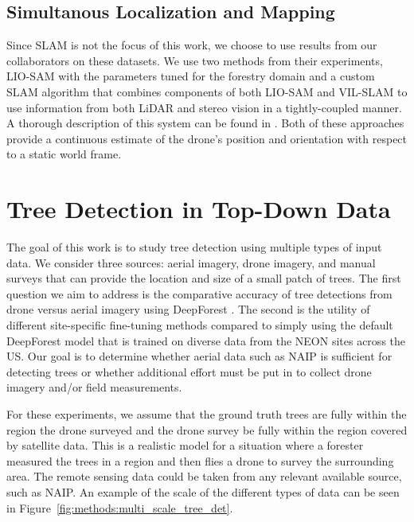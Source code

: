 \subsection{Simultanous Localization and Mapping}    
Since SLAM is not the focus of this work, we choose to use results from our collaborators on these datasets. We use two methods from their experiments, LIO-SAM \cite{Shan2020LIO-SAM:Mapping} with the parameters tuned for the forestry domain and a custom SLAM algorithm that combines components of both LIO-SAM and VIL-SLAM \cite{Shao2019StereoMapping} to use information from both LiDAR and stereo vision in a tightly-coupled manner. A thorough description of this system can be found in \cite{RussellUnmannedMitigation}. Both of these approaches provide a continuous estimate of the drone's position and orientation with respect to a static world frame.

\section{Tree Detection in Top-Down Data}
\label{sec:methods:tree_det}
The goal of this work is to study tree detection using multiple types of input data. We consider three sources: aerial imagery, drone imagery, and manual surveys that can provide the location and size of a small patch of trees. The first question we aim to address is the comparative accuracy of tree detections from drone versus aerial imagery using DeepForest \cite{Weinstein2020DeepForest:Delineation}. The second is the utility of different site-specific fine-tuning methods compared to simply using the default DeepForest model that is trained on diverse data from the NEON sites across the US. Our goal is to determine whether aerial data such as NAIP is sufficient for detecting trees or whether additional effort must be put in to collect drone imagery and/or field measurements. 

For these experiments, we assume that the ground truth trees are fully within the region the drone surveyed and the drone survey be fully within the region covered by satellite data. This is a realistic model for a situation where a forester measured the trees in a region and then flies a drone to survey the surrounding area. The remote sensing data could be taken from any relevant available source, such as NAIP. An example of the scale of the different types of data can be seen in Figure~\ref{fig:methods:multi_scale_tree_det}.

